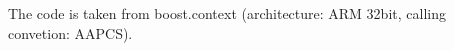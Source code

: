 \label{appendixa}

The code is taken from boost.context\cite{bcontext} (architecture: ARM 32bit,
calling convetion: AAPCS).


